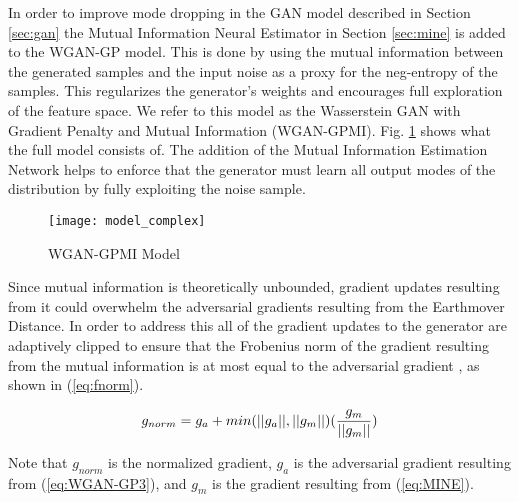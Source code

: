 In order to improve mode dropping in the GAN model described in Section \ref{sec:gan} the Mutual Information Neural Estimator in Section \ref{sec:mine} is added to the WGAN-GP model. This is done by using the mutual information between the generated samples and the input noise as a proxy for the neg-entropy of the samples. This regularizes the generator's weights and encourages full exploration of the feature space. We refer to this model as the Wasserstein GAN with Gradient Penalty and Mutual Information (WGAN-GPMI). Fig. \ref{fig:model_complex} shows what the full model consists of. The addition of the Mutual Information Estimation Network helps to enforce that the generator must learn all output modes of the distribution by fully exploiting the noise sample.

\begin{figure}[!htbp]
	\centering%
	\texttt{[image: model\_complex]}
	\caption{WGAN-GPMI Model}
	\label{fig:model_complex}
\end{figure}

Since mutual information is theoretically unbounded, gradient updates resulting from it could overwhelm the adversarial gradients resulting from the Earthmover Distance. In order to address this all of the gradient updates to the generator are adaptively clipped to ensure that the Frobenius norm of the gradient resulting from the mutual information is at most equal to the adversarial gradient \cite{Belghazi2018}, as shown in (\ref{eq:fnorm}).

\begin{equation}
	g_{norm} = g_a + min(||{g_a}||, ||{g_m}||)({g_m \over ||g_m||})
	\label{eq:fnorm}
\end{equation}
 
Note that $g_{norm}$ is the normalized gradient, $g_a$ is the adversarial gradient resulting from (\ref{eq:WGAN-GP3}), and $g_m$ is the gradient resulting from (\ref{eq:MINE}). 



